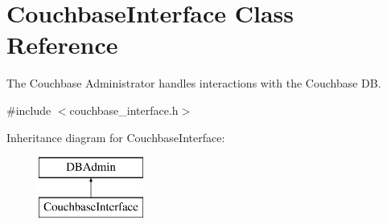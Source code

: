 \hypertarget{classCouchbaseInterface}{\section{Couchbase\-Interface Class Reference}
\label{classCouchbaseInterface}
}


The Couchbase Administrator handles interactions with the Couchbase D\-B.  




{\ttfamily \#include $<$couchbase\-\_\-interface.\-h$>$}

Inheritance diagram for Couchbase\-Interface\-:\begin{figure}[H]
\begin{center}
\leavevmode
\includegraphics[height=2.000000cm]{classCouchbaseInterface}
\end{center}
\end{figure}
